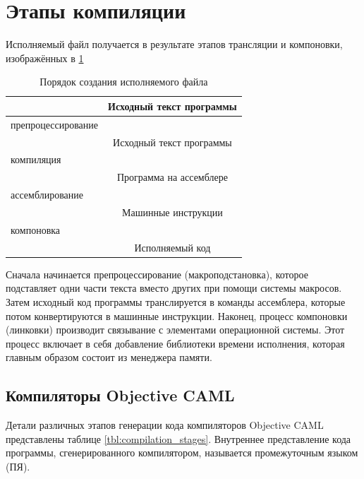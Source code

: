 \section {Этапы компиляции}
\label{sec:steps_of_compilation}

Исполняемый файл получается в результате этапов трансляции и компоновки,
изображённых в \ref{tbl:steps_in_the_production_of_an_executable}

\begin{table}[hc]
	\centering
	\caption{\label{tbl:steps_in_the_production_of_an_executable}Порядок
создания исполняемого файла}
	\begin{tabular}{|l|c|}
	\hline
	 & Исходный текст программы \\
	\hline
	препроцессирование & \\
	\hline
	 & Исходный текст программы \\
	\hline
	компиляция & \\
	\hline
	 & Программа на ассемблере \\
	\hline
	ассемблирование & \\
	\hline
	 & Машинные инструкции \\
	\hline
	компоновка & \\
	\hline
	 & Исполняемый код \\
	\hline
	\end{tabular}
\end{table}

Сначала начинается препроцессирование (макроподстановка), которое подставляет
одни части текста вместо других при помощи системы макросов. Затем исходный код
программы транслируется в команды ассемблера, которые потом конвертируются в
машинные инструкции. Наконец, процесс компоновки (линковки) производит
связывание с элементами операционной системы. Этот процесс включает в себя
добавление библиотеки времени исполнения, которая главным образом состоит из
менеджера памяти.

\subsection {Компиляторы Objective CAML}
\label{subsec:the_objective_caml_compilers}

Детали различных этапов генерации кода компиляторов Objective CAML представлены
таблице \ref{tbl:compilation_stages}. Внутреннее представление кода программы,
сгенерированного компилятором, называется промежуточным языком (ПЯ).

